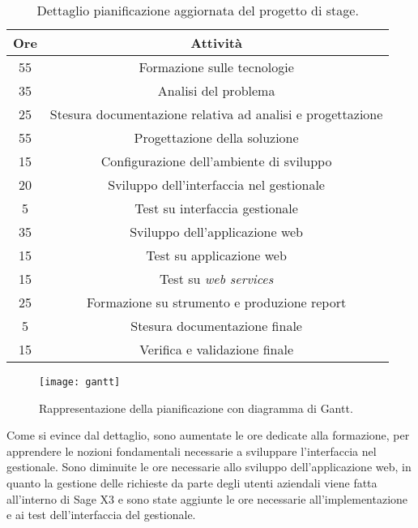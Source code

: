 \begin{center}
	\begin{longtable}{ | c| c|}
		\caption{Dettaglio pianificazione aggiornata del progetto di stage.}\\	
		\hline
		\textbf{Ore} & \textbf{Attività}\\
		\hline
		55 & Formazione sulle tecnologie\\
		\hline
		35 & Analisi del problema\\
		\hline
		25 & Stesura documentazione relativa ad analisi e progettazione\\
		\hline
		55 & Progettazione della soluzione\\
		\hline
		15 & Configurazione dell'ambiente di sviluppo\\
		\hline
		20 & Sviluppo dell'interfaccia nel gestionale\\
		\hline
		5 & Test su interfaccia gestionale\\
		\hline
		35 & Sviluppo dell'applicazione web\\
		\hline
		15 & Test su applicazione web\\
		\hline
		15 & Test su \textit{web services}\\
		\hline
		25 & Formazione su strumento e produzione report\\
		\hline
		5 & Stesura documentazione finale\\
		\hline
		15 & Verifica e validazione finale\\
		\hline
	\end{longtable}
\end{center}

\begin{figure}[htbp]
	\begin{center}
		\texttt{[image: gantt]}
		\caption{Rappresentazione della pianificazione con diagramma di Gantt.}
	\end{center}
\end{figure}

Come si evince dal dettaglio, sono aumentate le ore dedicate alla formazione, per apprendere le nozioni fondamentali necessarie a sviluppare l'interfaccia nel gestionale. Sono diminuite le ore necessarie allo sviluppo dell'applicazione web, in quanto la gestione delle richieste da parte degli utenti aziendali viene fatta all'interno di Sage X3 e sono state aggiunte le ore necessarie all'implementazione e ai test dell'interfaccia del gestionale.

